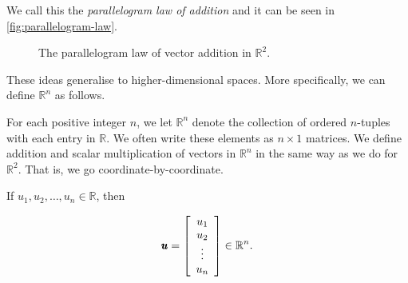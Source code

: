 We call this the \textit{parallelogram law of addition} and it can be seen in \autoref{fig:parallelogram-law}.

\begin{figure}[htbp]
    \centering
    \caption{The parallelogram law of vector addition in $\mathbb{R}^2$.}
    \label{fig:parallelogram-law}
\end{figure}

These ideas generalise to higher-dimensional spaces. More specifically, we can define $\mathbb{R}^n$ as follows.

\begin{definition}
    For each positive integer $n$, we let $\mathbb{R}^n$ denote the collection of ordered $n$-tuples with each entry in $\mathbb{R}$. We often write these elements as $n \times 1$ matrices. We define addition and scalar multiplication of vectors in $\mathbb{R}^n$ in the same way as we do for $\mathbb{R}^2$. That is, we go coordinate-by-coordinate.
\end{definition}

\begin{example}
    If $u_1, u_2, \ldots, u_n \in \mathbb{R}$, then

    \[
    \pmb{u} = \left[\begin{array}{c}
    u_1 \\
    u_2 \\
    \vdots \\
    u_n
    \end{array}\right] \in \mathbb{R}^n.
    \]
     
\end{example}

